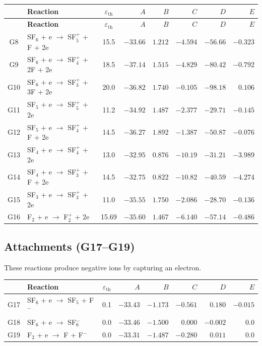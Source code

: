\documentclass[11pt,a4paper]{article}
\begin{document}
\begin{longtable}{clcrrrrr}
\toprule
 & \textbf{Reaction} & $\varepsilon_\text{th}$ & $A$ & $B$ & $C$ & $D$ & $E$ \\
\midrule
\endfirsthead
\midrule
 & \textbf{Reaction} & $\varepsilon_\text{th}$ & $A$ & $B$ & $C$ & $D$ & $E$ \\
\midrule
\endhead
G8  & SF$_6$ + e $\to$ SF$_5^+$ + F + 2e       & 15.5 & $-33.66$ & $1.212$ & $-4.594$ & $-56.66$ & $-0.323$ \\
G9  & SF$_6$ + e $\to$ SF$_4^+$ + 2F + 2e      & 18.5 & $-37.14$ & $1.515$ & $-4.829$ & $-80.42$ & $-0.792$ \\
G10 & SF$_6$ + e $\to$ SF$_3^+$ + 3F + 2e      & 20.0 & $-36.82$ & $1.740$ & $-0.105$ & $-98.18$ & $0.106$ \\
G11 & SF$_5$ + e $\to$ SF$_5^+$ + 2e           & 11.2 & $-34.92$ & $1.487$ & $-2.377$ & $-29.71$ & $-0.145$ \\
G12 & SF$_5$ + e $\to$ SF$_4^+$ + F + 2e       & 14.5 & $-36.27$ & $1.892$ & $-1.387$ & $-50.87$ & $-0.076$ \\
G13 & SF$_4$ + e $\to$ SF$_4^+$ + 2e           & 13.0 & $-32.95$ & $0.876$ & $-10.19$ & $-31.21$ & $-3.989$ \\
G14 & SF$_4$ + e $\to$ SF$_3^+$ + F + 2e       & 14.5 & $-32.75$ & $0.822$ & $-10.82$ & $-40.59$ & $-4.274$ \\
G15 & SF$_3$ + e $\to$ SF$_3^+$ + 2e           & 11.0 & $-35.55$ & $1.750$ & $-2.086$ & $-28.70$ & $-0.136$ \\
G16 & F$_2$ + e $\to$ F$_2^+$ + 2e             & 15.69& $-35.60$ & $1.467$ & $-6.140$ & $-57.14$ & $-0.486$ \\
\bottomrule
\end{longtable}

\subsection{Attachments (G17--G19)}

These reactions produce negative ions by capturing an electron.

\begin{longtable}{clcrrrrr}
\toprule
 & \textbf{Reaction} & $\varepsilon_\text{th}$ & $A$ & $B$ & $C$ & $D$ & $E$ \\
\midrule
G17 & SF$_6$ + e $\to$ SF$_5$ + F$^-$   & 0.1 & $-33.43$ & $-1.173$ & $-0.561$ & $0.180$ & $-0.015$ \\
G18 & SF$_6$ + e $\to$ SF$_6^-$         & 0.0 & $-33.46$ & $-1.500$ & $0.000$ & $-0.002$ & $0.0$ \\
G19 & F$_2$ + e $\to$ F + F$^-$         & 0.0 & $-33.31$ & $-1.487$ & $-0.280$ & $0.011$ & $0.0$ \\
\bottomrule
\end{longtable}
\end{document}
